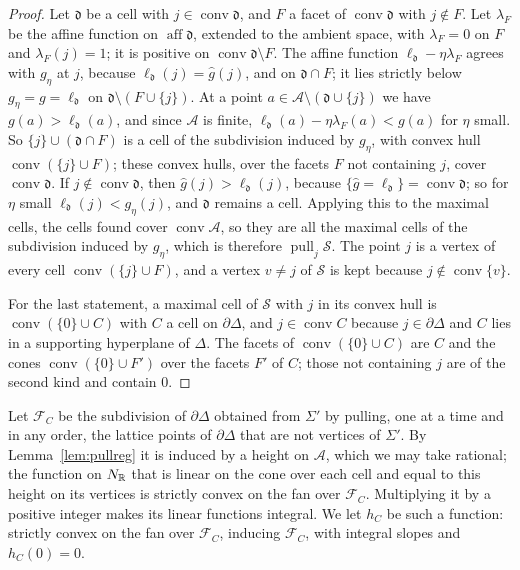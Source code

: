 \begin{proof}
Let $\mathfrak d$ be a cell with $j\in\operatorname{conv}\mathfrak d$, and $F$ a facet of $\operatorname{conv}\mathfrak d$ with $j\notin F$. Let
$\lambda_F$ be the affine function on $\operatorname{aff}\mathfrak d$, extended to the ambient space, with $\lambda_F=0$ on $F$ and $\lambda_F(j)=1$;
it is positive on $\operatorname{conv}\mathfrak d\setminus F$. The affine function $\ell_{\mathfrak d}-\eta\lambda_F$ agrees with $g_\eta$ at $j$,
because $\ell_{\mathfrak d}(j)=\hat g(j)$, and on $\mathfrak d\cap F$; it lies strictly below $g_\eta=g=\ell_{\mathfrak d}$ on
$\mathfrak d\setminus(F\cup\{j\})$. At a point $a\in\mathcal A\setminus(\mathfrak d\cup\{j\})$ we have $g(a)>\ell_{\mathfrak d}(a)$, and since $\mathcal A$ is
finite, $\ell_{\mathfrak d}(a)-\eta\lambda_F(a)<g(a)$ for $\eta$ small. So $\{j\}\cup(\mathfrak d\cap F)$ is a cell of the subdivision induced by
$g_\eta$, with convex hull $\operatorname{conv}(\{j\}\cup F)$; these convex hulls, over the facets $F$ not containing $j$, cover
$\operatorname{conv}\mathfrak d$. If $j\notin\operatorname{conv}\mathfrak d$, then $\hat g(j)>\ell_{\mathfrak d}(j)$, because
$\{\hat g=\ell_{\mathfrak d}\}=\operatorname{conv}\mathfrak d$; so for $\eta$ small $\ell_{\mathfrak d}(j)<g_\eta(j)$, and $\mathfrak d$ remains a
cell. Applying this to the maximal cells, the cells found cover $\operatorname{conv}\mathcal A$, so they are all the maximal cells of the
subdivision induced by $g_\eta$, which is therefore $\operatorname{pull}_j\mathcal S$. The point $j$ is a vertex of every cell
$\operatorname{conv}(\{j\}\cup F)$, and a vertex $v\ne j$ of $\mathcal S$ is kept because $j\notin\operatorname{conv}\{v\}$.

For the last statement, a maximal cell of $\mathcal S$ with $j$ in its convex hull is $\operatorname{conv}(\{0\}\cup C)$ with $C$ a cell on
$\partial\Delta$, and $j\in\operatorname{conv}C$ because $j\in\partial\Delta$ and $C$ lies in a supporting hyperplane of $\Delta$. The facets of
$\operatorname{conv}(\{0\}\cup C)$ are $C$ and the cones $\operatorname{conv}(\{0\}\cup F')$ over the facets $F'$ of $C$; those not containing
$j$ are of the second kind and contain $0$.
\end{proof}

Let $\mathcal F_C$ be the subdivision of $\partial\Delta$ obtained from $\Sigma'$ by pulling, one at a time and in any order, the lattice points
of $\partial\Delta$ that are not vertices of $\Sigma'$. By Lemma~\ref{lem:pullreg} it is induced by a height on $\mathcal A$, which we may take
rational; the function on $N_\mathbb R$ that is linear on the cone over each cell and equal to this height on its vertices is strictly convex on the
fan over $\mathcal F_C$. Multiplying it by a positive integer makes its linear functions integral. We let $h_C$ be such a function: strictly
convex on the fan over $\mathcal F_C$, inducing $\mathcal F_C$, with integral slopes and $h_C(0)=0$.

